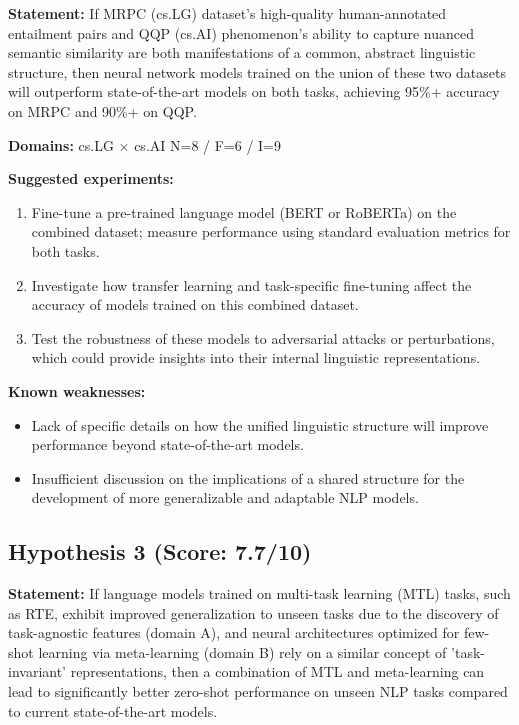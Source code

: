 \documentclass[12pt,a4paper]{article}
\begin{document}
\textbf{Statement:} If MRPC (cs.LG) dataset's high-quality human-annotated entailment pairs and QQP (cs.AI) phenomenon's ability to capture nuanced semantic similarity are both manifestations of a common, abstract linguistic structure, then neural network models trained on the union of these two datasets will outperform state-of-the-art models on both tasks, achieving 95\%+ accuracy on MRPC and 90\%+ on QQP.

\noindent\textbf{Domains:} cs.LG $\times$ cs.AI
\hspace{1em} N=8 / F=6 / I=9

\textbf{Suggested experiments:}
\begin{enumerate}
  \item Fine-tune a pre-trained language model (BERT or RoBERTa) on the combined dataset; measure performance using standard evaluation metrics for both tasks.
  \item Investigate how transfer learning and task-specific fine-tuning affect the accuracy of models trained on this combined dataset.
  \item Test the robustness of these models to adversarial attacks or perturbations, which could provide insights into their internal linguistic representations.
\end{enumerate}

\textbf{Known weaknesses:}
\begin{itemize}
  \item Lack of specific details on how the unified linguistic structure will improve performance beyond state-of-the-art models.
  \item Insufficient discussion on the implications of a shared structure for the development of more generalizable and adaptable NLP models.
\end{itemize}
\subsection*{Hypothesis 3 (Score: 7.7/10)}

\textbf{Statement:} If language models trained on multi-task learning (MTL) tasks, such as RTE, exhibit improved generalization to unseen tasks due to the discovery of task-agnostic features (domain A), and neural architectures optimized for few-shot learning via meta-learning (domain B) rely on a similar concept of 'task-invariant' representations, then a combination of MTL and meta-learning can lead to significantly better zero-shot performance on unseen NLP tasks compared to current state-of-the-art models.
\end{document}
